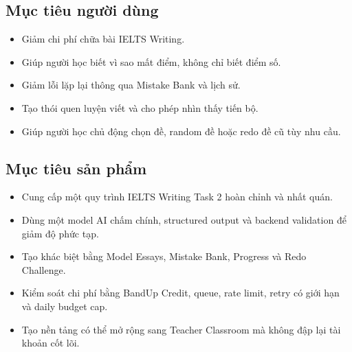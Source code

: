 \documentclass[11pt,a4paper]{article}
\begin{document}
\subsection{Mục tiêu người dùng}
\begin{itemize}
  \item Giảm chi phí chữa bài IELTS Writing.
  \item Giúp người học biết vì sao mất điểm, không chỉ biết điểm số.
  \item Giảm lỗi lặp lại thông qua Mistake Bank và lịch sử.
  \item Tạo thói quen luyện viết và cho phép nhìn thấy tiến bộ.
  \item Giúp người học chủ động chọn đề, random đề hoặc redo đề cũ tùy nhu cầu.
\end{itemize}
\subsection{Mục tiêu sản phẩm}
\begin{itemize}
  \item Cung cấp một quy trình IELTS Writing Task 2 hoàn chỉnh và nhất quán.
  \item Dùng một model AI chấm chính, structured output và backend validation để giảm độ phức tạp.
  \item Tạo khác biệt bằng Model Essays, Mistake Bank, Progress và Redo Challenge.
  \item Kiểm soát chi phí bằng BandUp Credit, queue, rate limit, retry có giới hạn và daily budget cap.
  \item Tạo nền tảng có thể mở rộng sang Teacher Classroom mà không đập lại tài khoản cốt lõi.
\end{itemize}
\end{document}
